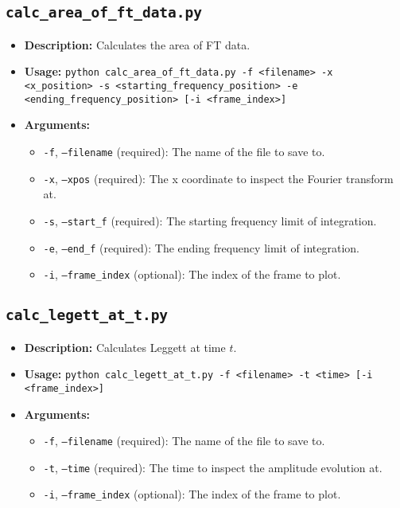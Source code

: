 \documentclass{article}
\begin{document}
\subsection{\texttt{calc\_area\_of\_ft\_data.py}}
\begin{itemize}
    \item \textbf{Description:} Calculates the area of FT data.
    \item \textbf{Usage:} \texttt{python calc\_area\_of\_ft\_data.py -f <filename> -x <x\_position> -s <starting\_frequency\_position> -e <ending\_frequency\_position> [-i <frame\_index>]}
    \item \textbf{Arguments:}
    \begin{itemize}
        \item \texttt{-f}, \texttt{--filename} (required): The name of the file to save to.
        \item \texttt{-x}, \texttt{--xpos} (required): The x coordinate to inspect the Fourier transform at.
        \item \texttt{-s}, \texttt{--start\_f} (required): The starting frequency limit of integration.
        \item \texttt{-e}, \texttt{--end\_f} (required): The ending frequency limit of integration.
        \item \texttt{-i}, \texttt{--frame\_index} (optional): The index of the frame to plot.
    \end{itemize}
\end{itemize}

\subsection{\texttt{calc\_legett\_at\_t.py}}
\begin{itemize}
    \item \textbf{Description:} Calculates Leggett at time \(t\).
    \item \textbf{Usage:} \texttt{python calc\_legett\_at\_t.py -f <filename> -t <time> [-i <frame\_index>]}
    \item \textbf{Arguments:}
    \begin{itemize}
        \item \texttt{-f}, \texttt{--filename} (required): The name of the file to save to.
        \item \texttt{-t}, \texttt{--time} (required): The time to inspect the amplitude evolution at.
        \item \texttt{-i}, \texttt{--frame\_index} (optional): The index of the frame to plot.
    \end{itemize}
\end{itemize}
\end{document}
